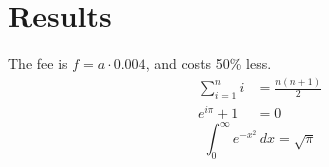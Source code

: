 \documentclass{article}
\begin{document}
\section*{Results}
The fee is $f = a \cdot 0.004$, and costs 50\% less.
\begin{align}
  \sum_{i=1}^{n} i &= \frac{n(n+1)}{2} \\
  e^{i\pi} + 1 &= 0
\end{align}
\[ \int_0^\infty e^{-x^2}\,dx = \sqrt{\pi} \]
\end{document}
